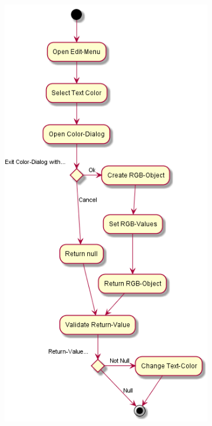 \begin{figure}[H]
    \centering
    \begin{subfigure}[b]{0.45\linewidth}
        \centering
        \includegraphics[width=\linewidth]{figures/color/color.png}

\end{subfigure}
\end{figure}
